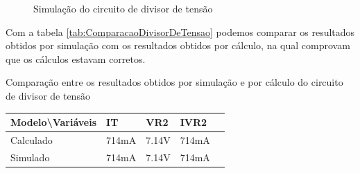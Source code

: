 \begin{figure}[H]
    \centering
    \caption{Simulação do circuito de divisor de tensão}
    \vspace{-0.3cm}
    \label{fig:DivisorDeTensao}
\end{figure}

Com a tabela \ref{tab:ComparacaoDivisorDeTensao} podemos comparar os resultados obtidos por simulação com os resultados obtidos por cálculo, na qual comprovam que os cálculos estavam corretos.

\begin{quadro}[H]
    \centering
    \caption{Comparação entre os resultados obtidos por simulação e por cálculo do circuito de divisor de tensão}
    \begin{tabular}{|C{0.34\textwidth}|C{0.19\textwidth}|C{0.19\textwidth}|C{0.19\textwidth}|C{0.19\textwidth}|}
        \hline
        \textbf{Modelo\textbackslash{}Variáveis} & \textbf{IT} & \textbf{VR2} & \textbf{IVR2} \\
        \hline
        Calculado & 714mA & 7.14V & 714mA \\
        \hline
        Simulado & 714mA & 7.14V & 714mA \\
        \hline
    \end{tabular}
    \vspace{-0.6cm}
    \label{tab:ComparacaoDivisorDeTensao}
\end{quadro}

